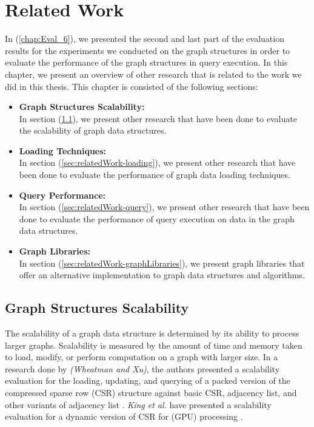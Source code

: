 {\chapter{Related Work}
\label{chap:RelatedWork}


In (\ref{chap:Eval_6}), we presented the second and last part of the evaluation results for the experiments we conducted on the graph structures in order to evaluate the performance of the graph structures in query execution. In this chapter, we present an overview of other research that is related to the work we did in this thesis. This chapter is consisted of the following sections:

\begin{itemize}  

\item \textbf{Graph Structures Scalability:}\\
In section (\ref{sec:relatedWork-scalability}), we present other research that have been done to evaluate the scalability of graph data structures.

\item \textbf{Loading Techniques:}\\
In section (\ref{sec:relatedWork-loading}), we present other research that have been done to evaluate the performance of graph data loading techniques.

\item \textbf{Query Performance:}\\
In section (\ref{sec:relatedWork-query}), we present other research that have been done to evaluate the performance of query execution on data in the graph data structures.

\item \textbf{Graph Libraries:}\\
In section (\ref{sec:relatedWork-graphLibraries}), we present graph libraries that offer an alternative implementation to graph data structures and algorithms.

\end{itemize}


\section{Graph Structures Scalability}
\label{sec:relatedWork-scalability}

The scalability of a graph data structure is determined by its ability to process larger graphs. Scalability is measured by the amount of time and memory taken to load, modify, or perform computation on a graph with larger size. In a research done by \textit{(Wheatman and Xu)}, the authors presented a scalability evaluation for the loading, updating, and querying of a packed version of the compressed sparse row (CSR) structure against basic CSR, adjacency list, and other variants of adjacency list \cite{wheatmanpacked}. \textit{King et al.} have presented a scalability evaluation for a dynamic version of CSR for (GPU) processing \cite{King2016DynamicCSRA}.

}
